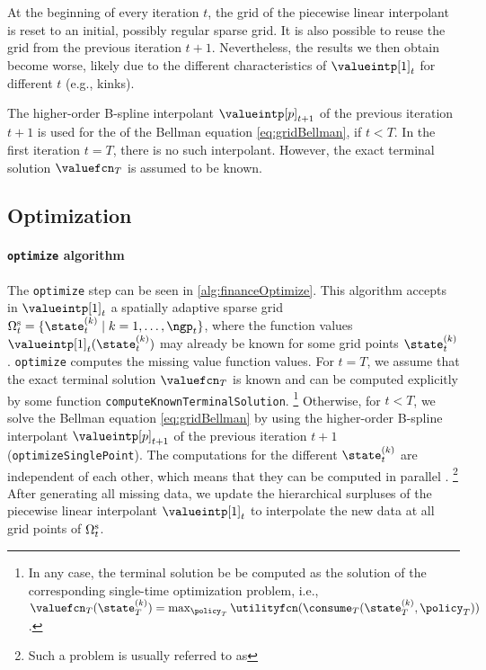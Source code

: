 At the beginning of every iteration $t$,
the grid of the piecewise linear interpolant is reset
to an initial, possibly regular sparse grid.
It is also possible to reuse the grid from the
previous iteration $t + 1$.
Nevertheless, the results we then obtain become worse,
likely due to the different characteristics of $\valueintp[1]_t$
for different $t$ (e.g., kinks).

The higher-order B-spline interpolant
$\valueintp[p]_{t+1}$ of the previous iteration $t+1$ is used
for the \rhs of the Bellman equation \eqref{eq:gridBellman},
if $t < T$.
In the first iteration $t = T$,
there is no such interpolant.
However,
the exact terminal solution $\valuefcn_T$ is assumed to be known.



\subsection{Optimization}
\label{sec:823optimization}

\paragraph{\texttt{optimize} algorithm}

The \texttt{optimize} step can be seen in \cref{alg:financeOptimize}.
This algorithm accepts in $\valueintp[1]_t$
a spatially adaptive sparse grid
$\gridset{t}{\sparse}
= \{\state_t^{(k)} \mid k = 1, \dotsc, \ngp_t\}$,
where the function values $\valueintp[1]_t(\state_t^{(k)})$
may already be known for some grid points $\state_t^{(k)}$.
\texttt{optimize} computes the missing value function values.
For $t = T$, we assume that the exact terminal solution
$\valuefcn_T$ is known and can be computed explicitly by some function
\texttt{computeKnownTerminalSolution}.%
\footnote{%
  In any case, the terminal solution be be computed as the
  solution of the corresponding single-time optimization problem,
  i.e., $\valuefcn_T(\state_T^{(k)})
  = \max_{\policy_T} \utilityfcn(\consume_T(\state_T^{(k)}, \policy_T))$.%
}
Otherwise, for $t < T$, we solve the Bellman equation
\eqref{eq:gridBellman} by using the higher-order B-spline interpolant
$\valueintp[p]_{t+1}$ of the previous iteration $t + 1$
(\texttt{optimizeSinglePoint}).
The computations for the different $\state_t^{(k)}$ are
independent of each other,
which means that they can be computed in parallel \cite{Horneff16Efficient}.%
\footnote{%
  Such a problem is usually referred to as %
}
After generating all missing data,
we update the hierarchical surpluses of the
piecewise linear interpolant $\valueintp[1]_t$
to interpolate the new data at all grid points of $\gridset{t}{\sparse}$.

